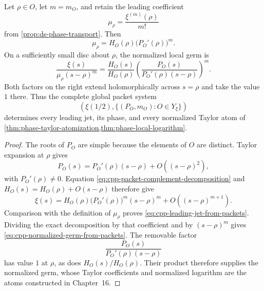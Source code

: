 \begin{theorem}
\label{thm:cpp-global-to-local-jet}
Let \(\rho\in O\), let \(m=m_O\), and retain the leading coefficient
\[
 \mu_\rho=\frac{\xi^{(m)}(\rho)}{m!}
\]
from \cref{prop:ds-phase-transport}.  Then
\begin{equation}
\label{eq:cpp-leading-jet-from-packets}
 \mu_\rho
 =
 H_O(\rho)\bigl(P_O'(\rho)\bigr)^m.
\end{equation}
On a sufficiently small disc about \(\rho\), the normalized local germ is
\begin{equation}
\label{eq:cpp-normalized-germ-from-packets}
 \frac{\xi(s)}{\mu_\rho(s-\rho)^m}
 =
 \frac{H_O(s)}{H_O(\rho)}
 \left(
 \frac{P_O(s)}
 {P_O'(\rho)(s-\rho)}
 \right)^m.
\end{equation}
Both factors on the right extend holomorphically across \(s=\rho\) and take
the value \(1\) there.  Thus the complete global packet system
\[
 \left(
 \xi(1/2),\{(P_O,m_O):O\in Y_\xi\}
 \right)
\]
determines every leading jet, its phase, and every normalized Taylor atom of
\cref{thm:phase-taylor-atomization,thm:phase-local-logarithm}.
\end{theorem}

\begin{proof}
The roots of \(P_O\) are simple because the elements of \(O\) are distinct.
Taylor expansion at \(\rho\) gives
\[
 P_O(s)=P_O'(\rho)(s-\rho)+O((s-\rho)^2),
\]
with \(P_O'(\rho)\ne0\).  Equation
\eqref{eq:cpp-packet-complement-decomposition} and
\(H_O(s)=H_O(\rho)+O(s-\rho)\) therefore give
\[
 \xi(s)
 =
 H_O(\rho)\bigl(P_O'(\rho)\bigr)^m(s-\rho)^m
 +O((s-\rho)^{m+1}).
\]
Comparison with the definition of \(\mu_\rho\) proves
\eqref{eq:cpp-leading-jet-from-packets}.  Dividing the exact decomposition by
that coefficient and by \((s-\rho)^m\) gives
\eqref{eq:cpp-normalized-germ-from-packets}.  The removable factor
\[
 \frac{P_O(s)}{P_O'(\rho)(s-\rho)}
\]
has value \(1\) at \(\rho\), as does \(H_O(s)/H_O(\rho)\).  Their product
therefore supplies the normalized germ, whose Taylor coefficients and
normalized logarithm are the atoms constructed in Chapter~16.
\end{proof}

